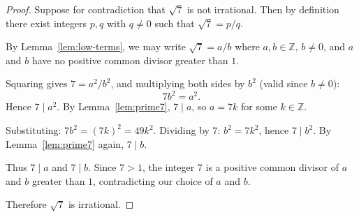 \begin{proof}
Suppose for contradiction that $\sqrt{7}$ is not irrational. Then by definition there exist integers $p, q$ with $q \neq 0$ such that $\sqrt{7} = p/q$.

By Lemma~\ref{lem:low-terms}, we may write $\sqrt{7} = a/b$ where $a, b \in \mathbb{Z}$, $b \neq 0$, and $a$ and $b$ have no positive common divisor greater than $1$.

Squaring gives $7 = a^2/b^2$, and multiplying both sides by $b^2$ (valid since $b \neq 0$):
\[
7b^2 = a^2.
\]
Hence $7 \mid a^2$. By Lemma~\ref{lem:prime7}, $7 \mid a$, so $a = 7k$ for some $k \in \mathbb{Z}$.

Substituting: $7b^2 = (7k)^2 = 49k^2$. Dividing by $7$: $b^2 = 7k^2$, hence $7 \mid b^2$. By Lemma~\ref{lem:prime7} again, $7 \mid b$.

Thus $7 \mid a$ and $7 \mid b$. Since $7 > 1$, the integer $7$ is a positive common divisor of $a$ and $b$ greater than $1$, contradicting our choice of $a$ and $b$.

Therefore $\sqrt{7}$ is irrational.
\end{proof}
